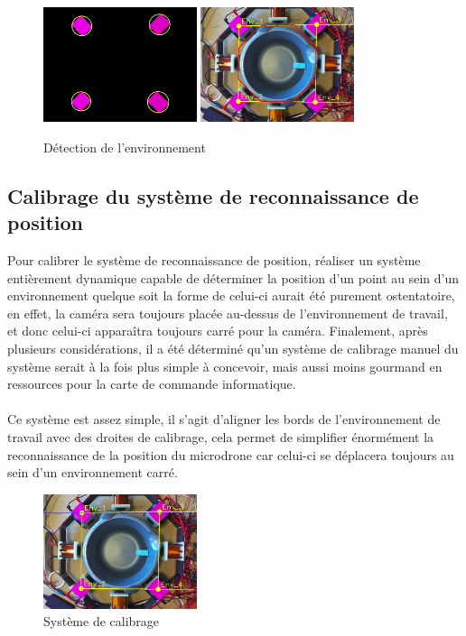 \documentclass{article}
\begin{document}
        \begin{figure}[H]
        	\centering
        	\includegraphics[width = 0.4\textwidth]{Images/view_mask_2}
        	\hspace{1cm}
        	\includegraphics[width = 0.4\textwidth]{Images/view_env}
        	\caption{Détection de l'environnement}
        	\label{ref:Camera environment detection}
        \end{figure}

    \subsection{Calibrage du système de reconnaissance de position}
        Pour calibrer le système de reconnaissance de position, réaliser un système entièrement dynamique capable de déterminer la position d'un point au sein d'un environnement quelque soit la forme de celui-ci aurait été purement ostentatoire, en effet, la caméra sera toujours placée au-dessus de l'environnement de travail, et donc celui-ci apparaîtra toujours carré pour la caméra. Finalement, après plusieurs considérations, il a été déterminé qu'un système de calibrage manuel du système serait à la fois plus simple à concevoir, mais aussi moins gourmand en ressources pour la carte de commande informatique.
        \\\\
        Ce système est assez simple, il s'agit d'aligner les bords de l'environnement de travail avec des droites de calibrage, cela permet de simplifier énormément la reconnaissance de la position du microdrone car celui-ci se déplacera toujours au sein d'un environnement carré.

        \begin{figure}[H]
        	\centering
        	\includegraphics[width = 0.4\textwidth]{Images/view_cal}
        	\caption{Système de calibrage}
        	\label{ref:Camera calibration system}
        \end{figure}
\end{document}
